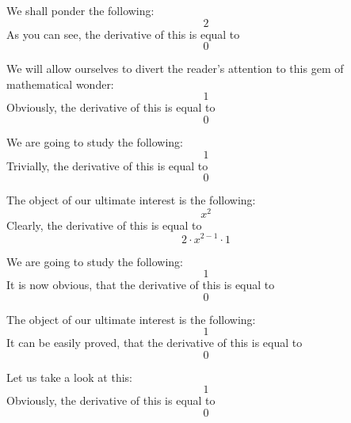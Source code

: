 \documentclass{article}
\begin{document}
We shall ponder the following:
\begin{equation}
2 
\end{equation}
As you can see, the derivative of this is equal to
\begin{equation}
0 
\end{equation}

We will allow ourselves to divert the reader's attention to this gem of mathematical wonder:
\begin{equation}
1 
\end{equation}
Obviously, the derivative of this is equal to
\begin{equation}
0 
\end{equation}

We are going to study the following:
\begin{equation}
1 
\end{equation}
Trivially, the derivative of this is equal to
\begin{equation}
0 
\end{equation}

The object of our ultimate interest is the following:
\begin{equation}
x ^{2 } 
\end{equation}
Clearly, the derivative of this is equal to
\begin{equation}
2 \cdot x ^{2 - 1 } \cdot 1 
\end{equation}

We are going to study the following:
\begin{equation}
1 
\end{equation}
It is now obvious, that the derivative of this is equal to
\begin{equation}
0 
\end{equation}

The object of our ultimate interest is the following:
\begin{equation}
1 
\end{equation}
It can be easily proved, that the derivative of this is equal to
\begin{equation}
0 
\end{equation}

Let us take a look at this:
\begin{equation}
1 
\end{equation}
Obviously, the derivative of this is equal to
\begin{equation}
0 
\end{equation}
\end{document}
